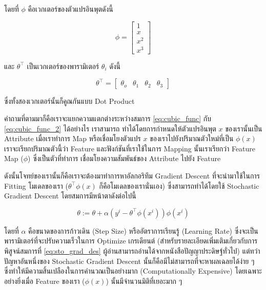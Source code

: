 โดยที่ $\phi$ คือเวกเตอร์ของตัวแปรอินพุตดังนี้

\begin{equation}
\phi = 
\begin{bmatrix}
    1 \\
    x \\
    x^{2} \\
    x^{3} 
\end{bmatrix}
\end{equation}

และ $\theta^{\top}$ เป็นเวกเตอร์ของพารามิเตอร์ $\theta_{i}$ ดังนี้

\begin{equation}
\theta^{\top} =
\begin{bmatrix}
    \theta_{o} & \theta_{1} & \theta_{2} & \theta_{3}
\end{bmatrix}
\end{equation}

\noindent ซึ่งทั้งสองเวกเตอร์นั้นก็คูณกันแบบ Dot Product
 
คำถามที่ตามมาก็คือเราจะแยกความแตกต่างระหว่างสมการ \ref{eq:cubic_func} กับ \ref{eq:cubic_func_2} ได้อย่างไร เราสามารถ%
ทำได้โดยการกำหนดให้ตัวแปรอินพุต $x$ ของเรานั้นเป็น Attribute เมื่อเราทำการ Map หรือเชื่อมโยงตัวแปร $x$ ของเราไปยังปริมาณตัวใหม่ที่เป็น
$\phi(x)$ เราจะเรียกปริมาณตัวนี้ว่า Feature และฟังก์ชันที่เราใช้ในการ Mapping นั้นเราเรียกว่า Feature Map ($\phi$) ซึ่งเป็นตัวที่ทำการ%
เชื่อมโยงความสัมพันธ์ของ Attribute ไปยัง Feature

ดังนั้นโจทย์ของเรานั้นก็คือเราจะต้องมาทำการหาอัลกอริทึม Gradient Descent ที่จะนำมาใช้ในการ Fitting โมเดลของเรา 
($\theta^{\top}\phi(x)$ ก็คือโมเดลของเรานั่นเอง) ซึ่งสามารถทำได้โดยใช้ Stochastic Gradient Descent โดยสมการมีหน้าตาดังต่อไปนี้

\begin{equation}\label{eq:sto_grad_des}
    \theta := \theta + \alpha (y^{i} - \theta^{\top}\phi(x^{i}))\phi(x^{i})
\end{equation}

โดยที่ $\alpha$ คือขนาดของการก้าวเดิน (Step Size) หรืออัตราการเรียนรู้ (Learning Rate) ซึ่งจะเป็นพารามิเตอร์ที่จะปรับความเร็วในการ%
Optimize เกรเดียนต์ (สำหรับรายละเอียดเพิ่มเติมเกี่ยวกับการพิสูจน์สมการที่ \ref{eq:sto_grad_des} ผู้อ่านสามารถอ่านได้จากหนังสือปัญญาประดิษฐ์ทั่วไป) 
แต่ทว่าปัญหาอันหนึ่งของ Stochastic Gradient Descent นั้นก็คือมีไม่สามารถที่จะหาผลเฉลยได้ง่าย ๆ ซึ่งทำให้มีความสิ้นเปลืองในการคำนวณเป็นอย่างมาก 
(Computationally Expensive) โดยเฉพาะอย่างยิ่งเมื่อ Feature ของเรา ($\phi(x)$) นั้นมีจำนวนมิติที่เยอะมาก ๆ

